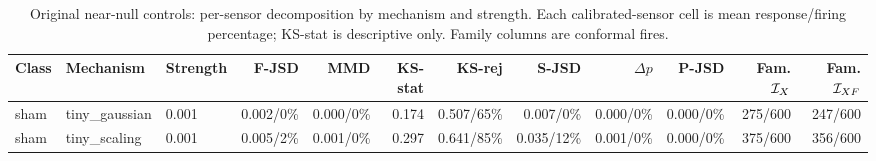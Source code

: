 \begin{table}[!b]
\caption{Original near-null controls: per-sensor decomposition by mechanism and strength. Each calibrated-sensor cell is mean response/firing percentage; KS-stat is descriptive only. Family columns are conformal fires.}
\label{tab:v137-decomp-1}
\centering\scriptsize\renewcommand{\arraystretch}{0.94}\setlength{\tabcolsep}{2.1pt}
\begin{tabular}{@{}lllrrrrrrrrr@{}}
\toprule
Class & Mechanism & Strength & F-JSD & MMD & KS-stat & KS-rej & S-JSD & $\Delta p$ & P-JSD & Fam. $\mathcal I_X$ & Fam. $\mathcal I_{XF}$ \\
\midrule
sham & tiny\_gaussian & 0.001 & 0.002/0\% & 0.000/0\% & 0.174 & 0.507/65\% & 0.007/0\% & 0.000/0\% & 0.000/0\% & 275/600 & 247/600 \\
sham & tiny\_scaling & 0.001 & 0.005/2\% & 0.001/0\% & 0.297 & 0.641/85\% & 0.035/12\% & 0.001/0\% & 0.000/0\% & 375/600 & 356/600 \\
\bottomrule
\end{tabular}
\end{table}

